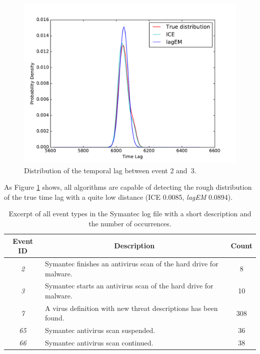 \documentclass[conference]{IEEEtran}
\theoremstyle{examplestyle}
\begin{document}
\begin{figure}[!tb]
	\centering
	\includegraphics[scale=0.4]{images/symantec/2-3.pdf}
	\caption{Distribution of the temporal lag between event 2 and~3.}
	\label{fig:2-3}
\end{figure}

As Figure \ref{fig:2-3} shows, all algorithms are capable of detecting the rough distribution of the true time lag with a quite low distance (\ac{ICE} 0.0085, \textit{lagEM} 0.0894).


\begin{table}[!ht]
	\centering
	\begin{tabular}{c p{} c}
		\textbf{Event ID} & \multicolumn{1}{c}{\textbf{Description}} & \textbf{Count} \\
		\hline
		\textit{2}	& Symantec finishes an antivirus scan of the hard drive for malware. & 8 \\
		\textit{3}	& Symantec starts an antivirus scan of the hard drive for malware. & 10 \\
		\textit{7}	& A virus definition with new threat descriptions has been found. & 308 \\
		\textit{65}	& Symantec antivirus scan suspended. & 36 \\
		\textit{66}	& Symantec antivirus scan continued. & 38 \\
	\end{tabular}
	\caption{Excerpt of all event types in the Symantec log file with a short description and the number of occurrences.}
	\label{tbl:symantecEvents}
\end{table}
\end{document}
